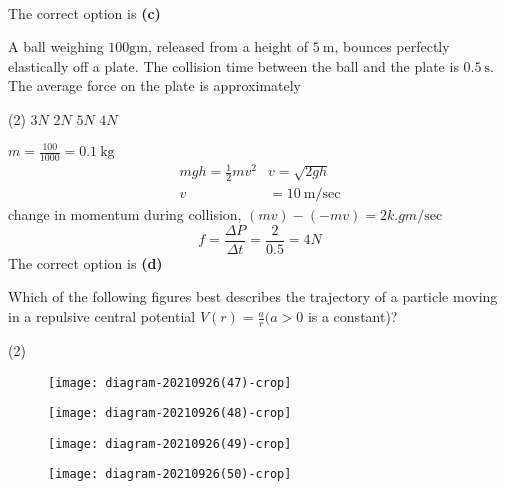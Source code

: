 \begin{enumerate}
\begin{answer}
\begin{align*}
	\end{align*}
	The correct option is \textbf{(c)}
\end{answer}
\begin{minipage}{\textwidth}
	\item A ball weighing $100 \mathrm{gm}$, released from a height of $5 \mathrm{~m}$, bounces perfectly elastically off a plate. The collision time between the ball and the plate is $0.5 \mathrm{~s}$. The average force on the plate is approximately
\end{minipage}
\begin{tasks}(2)
	\task[\textbf{A.}] $3 N$
	\task[\textbf{B.}]$2 N$
	\task[\textbf{C.}]$5 N$
	\task[\textbf{D.}]$4 N$
\end{tasks}
\begin{answer}
$m=\frac{100}{1000}=0.1 \mathrm{~kg}$\\
$$
\begin{array}{rl}
m g h=\frac{1}{2} m v^{2} & v=\sqrt{2 g h} \\
v & =10 \mathrm{~m} / \mathrm{sec}
\end{array}
$$
change in momentum during collision, $(m v)-(-m v)=2 k . g m / \mathrm{sec}$
$$
f=\frac{\Delta P}{\Delta t}=\frac{2}{0.5}=4 N
$$
The correct option is \textbf{(d)}	
\end{answer}
\begin{minipage}{\textwidth}
	\item Which of the following figures best describes the trajectory of a particle moving in a repulsive central potential $V(r)=\frac{a}{r}(a>0$ is a constant)?
\end{minipage}
\begin{tasks}(2)
	\task[\textbf{A.}]\begin{figure}[H]
		\centering
		\texttt{[image: diagram-20210926(47)-crop]}
	\end{figure}
	\task[\textbf{B.}]\begin{figure}[H]
		\centering
		\texttt{[image: diagram-20210926(48)-crop]}
	\end{figure}
	\task[\textbf{C.}]\begin{figure}[H]
		\centering
		\texttt{[image: diagram-20210926(49)-crop]}
	\end{figure}
	\task[\textbf{D.}]\begin{figure}[H]
		\centering
		\texttt{[image: diagram-20210926(50)-crop]}
	\end{figure}

\end{tasks}
\end{enumerate}
